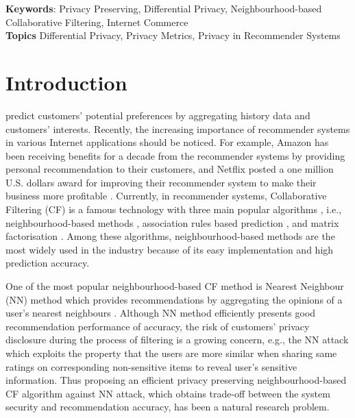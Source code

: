\documentclass[11pt]{article}
\begin{document}
{\bf Keywords}: Privacy Preserving, Differential Privacy, Neighbourhood-based Collaborative Filtering, Internet Commerce
~\\

{\bf Topics} Differential Privacy, Privacy Metrics, Privacy in Recommender Systems
~\\


\section{Introduction}
\label{INTRO}

  predict customers' potential preferences by aggregating history data and customers' interests. Recently, the increasing importance of recommender systems in various Internet applications should be noticed. For example, Amazon has been receiving benefits for a decade from the recommender systems by providing personal recommendation to their customers, and Netflix posted a one million U.S. dollars award for improving their recommender system to make their business more profitable \cite{SCHAFER1999, EKSTRAND2011, KABBUR2013}. Currently, in recommender systems, Collaborative Filtering (CF) is a famous technology with three main popular algorithms \cite{LIU2011}, i.e., neighbourhood-based methods \cite{EKSTRAND2011}, association rules based prediction \cite{HERLOCKER2002}, and matrix factorisation \cite{KOREN2009}. Among these algorithms, neighbourhood-based methods are the most widely used in the industry because of its easy implementation and high prediction accuracy.

One of the most popular neighbourhood-based CF method is  Nearest Neighbour (NN) method which provides recommendations by aggregating the opinions of a user's  nearest neighbours \cite{ADOMAVICIUS2005}. Although NN method efficiently presents good recommendation performance of accuracy, the risk of customers' privacy disclosure during the process of filtering is a growing concern, e.g., the NN attack \cite{CALANDRINO2011} which exploits the property that the users are more similar when sharing same ratings on corresponding non-sensitive items to reveal user's sensitive information. Thus proposing an efficient privacy preserving neighbourhood-based CF algorithm against NN attack, which obtains trade-off between the system security and recommendation accuracy, has been a natural research problem.
\end{document}
